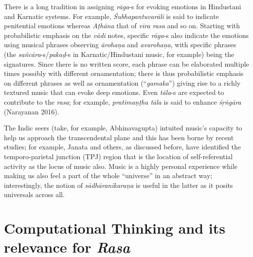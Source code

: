 There is a long tradition in assigning \textsl{rāga}-s for evoking emotions in Hindustani and Karnatic systems. For example, \textsl{Śubhapantuvarāli} is said to indicate penitential emotions whereas \textsl{Aṭhāna} that of \textsl{vīra rasa} and so on. Starting with probabilistic emphasis on the \textsl{vādi} notes, specific \textsl{rāga}-s also indicate the emotions using musical phrases observing \textsl{ārohaṇa} and \textsl{avarohaṇa}, with specific phrases (the \textsl{sañcāra}-s/\textsl{pakaḍ}-s in Karnatic/Hindustani music, for example) being the signatures. Since there is no written score, each phrase can be elaborated multiple times possibly with different ornamentation; there is thus probabilistic emphasis on different phrases as well as ornamentation (“\textsl{gamaka}”) giving rise to a richly textured music that can evoke deep emotions. Even \textsl{tāla}-s are expected to contribute to the \textsl{rasa}; for example, \textsl{pratimaṇṭha tāla} is said to enhance \textsl{śṛṅgāra} (Narayanan 2016). 

The Indic seers (take, for example, Abhinavagupta) intuited music’s capacity to help us approach the transcendental plane and this has been borne by recent studies; for example, Janata and others, as discussed before, have identified the temporo-parietal junction (TPJ) region that is the location of self-referential activity as the locus of music also. Music is a highly personal experience while making us also feel a part of the whole “universe” in an abstract way; interestingly, the notion of \textsl{sādhāranīkaraṇa} is useful in the latter as it posits universals across all.

\section{Computational Thinking and its relevance for \textsl{Rasa}}\label{chap3-sec5}

